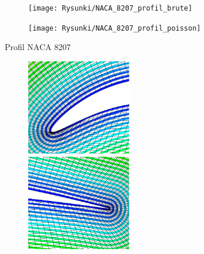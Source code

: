 \begin{figure}[h]	
    \begin{subfigure}[h]{\textwidth}
    	\centering
    	\texttt{[image: Rysunki/NACA\_8207\_profil\_brute]}
	\end{subfigure}    
	\begin{subfigure}[h]{\textwidth}
		\centering
    	\texttt{[image: Rysunki/NACA\_8207\_profil\_poisson]}      	
	\end{subfigure}
	\caption{Profil NACA 8207}
\end{figure}

\begin{figure}[h]	
    \begin{subfigure}[h]{\textwidth}
    	\includegraphics[width=0.5\textwidth]{Rysunki/NACA_8207_nosek_brute}  
    	\quad      
    	\includegraphics[width=0.5\textwidth]{Rysunki/NACA_8207_ostrze_brute}
    	\vspace{1cm}
	\end{subfigure}
    

\end{figure}
